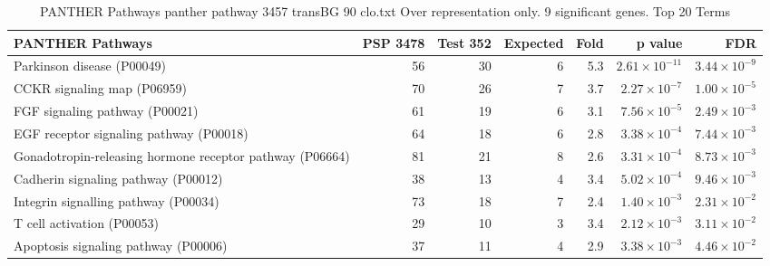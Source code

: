 \begin{table}[ht]
\centering
\begin{adjustbox}{width=\textwidth}
\begin{tabular}{lrrrrrr}
  \hline
PANTHER Pathways & PSP 3478 & Test 352 & Expected & Fold & p value & FDR \\ 
  \hline
Parkinson disease (P00049) & 56 & 30 & 6 & 5.3 & $2.61 \times 10^{-11}$ & $3.44 \times 10^{-9}$ \\ 
  CCKR signaling map (P06959) & 70 & 26 & 7 & 3.7 & $2.27 \times 10^{-7}$ & $1.00 \times 10^{-5}$ \\ 
  FGF signaling pathway (P00021) & 61 & 19 & 6 & 3.1 & $7.56 \times 10^{-5}$ & $2.49 \times 10^{-3}$ \\ 
  EGF receptor signaling pathway (P00018) & 64 & 18 & 6 & 2.8 & $3.38 \times 10^{-4}$ & $7.44 \times 10^{-3}$ \\ 
  Gonadotropin-releasing hormone receptor pathway (P06664) & 81 & 21 & 8 & 2.6 & $3.31 \times 10^{-4}$ & $8.73 \times 10^{-3}$ \\ 
  Cadherin signaling pathway (P00012) & 38 & 13 & 4 & 3.4 & $5.02 \times 10^{-4}$ & $9.46 \times 10^{-3}$ \\ 
  Integrin signalling pathway (P00034) & 73 & 18 & 7 & 2.4 & $1.40 \times 10^{-3}$ & $2.31 \times 10^{-2}$ \\ 
  T cell activation (P00053) & 29 & 10 & 3 & 3.4 & $2.12 \times 10^{-3}$ & $3.11 \times 10^{-2}$ \\ 
  Apoptosis signaling pathway (P00006) & 37 & 11 & 4 & 2.9 & $3.38 \times 10^{-3}$ & $4.46 \times 10^{-2}$ \\ 
   \hline
\end{tabular}
\end{adjustbox}
\caption{PANTHER Pathways panther pathway 3457 transBG 90 clo.txt Over representation only. 9 significant genes. Top 20 Terms} 
\label{tab:PANTHER Pathways panther pathway 3457 transBG 90 clo.txt Over representation only. 9 significant genes. Top 20 Terms}
\end{table}




